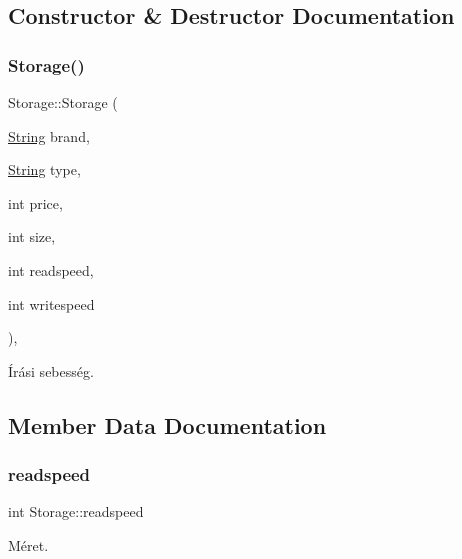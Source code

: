 \subsection{Constructor \& Destructor Documentation}
\mbox{\label{class_storage_a502a2ec76e09d48a87da6ed1b91cdaa8}} 
\subsubsection{\texorpdfstring{Storage()}{Storage()}}
{\footnotesize\ttfamily Storage\+::\+Storage (\begin{DoxyParamCaption}\item[{\mbox{\hyperlink{class_string}{String}}}]{brand,  }\item[{\mbox{\hyperlink{class_string}{String}}}]{type,  }\item[{int}]{price,  }\item[{int}]{size,  }\item[{int}]{readspeed,  }\item[{int}]{writespeed }\end{DoxyParamCaption})\hspace{0.3cm}{\ttfamily [inline]}, {\ttfamily [explicit]}}



Írási sebesség. 



\subsection{Member Data Documentation}
\mbox{\label{class_storage_a41073842ff16961dad3903e6dd49bb0c}} 
\subsubsection{\texorpdfstring{readspeed}{readspeed}}
{\footnotesize\ttfamily int Storage\+::readspeed\hspace{0.3cm}{\ttfamily [protected]}}



Méret. 

\mbox{\label{class_storage_abcc80ce58a21fa884035617ee0b6cb67}} 
